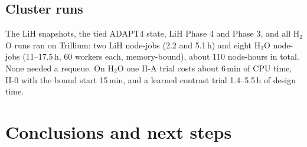 \documentclass[10.5pt]{article}
\begin{document}
\subsection{Cluster runs}

The LiH snapshots, the tied ADAPT4 state, LiH Phase 4 and Phase 3, and all H$_2$O runs ran on Trillium: two LiH node-jobs (2.2 and 5.1\,h) and eight H$_2$O node-jobs (11--17.5\,h, 60 workers each, memory-bound), about 110 node-hours in total. None needed a requeue. On H$_2$O one II-A trial costs about 6\,min of CPU time, II-0 with the bound start 15\,min, and a learned contrast trial 1.4--5.5\,h of design time.

\section{Conclusions and next steps}
\end{document}
